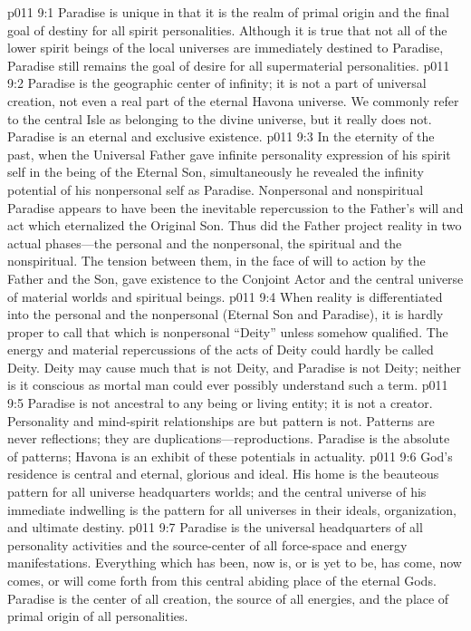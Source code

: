 \vs p011 9:1 Paradise is unique in that it is the realm of primal origin and the final goal of destiny for all spirit personalities. Although it is true that not all of the lower spirit beings of the local universes are immediately destined to Paradise, Paradise still remains the goal of desire for all supermaterial personalities.
\pc \vs p011 9:2 Paradise is the geographic center of infinity; it is not a part of universal creation, not even a real part of the eternal Havona universe. We commonly refer to the central Isle as belonging to the divine universe, but it really does not. Paradise is an eternal and exclusive existence.
\pc \vs p011 9:3 In the eternity of the past, when the Universal Father gave infinite personality expression of his spirit self in the being of the Eternal Son, simultaneously he revealed the infinity potential of his nonpersonal self as Paradise. Nonpersonal and nonspiritual Paradise appears to have been the inevitable repercussion to the Father’s will and act which eternalized the Original Son. Thus did the Father project reality in two actual phases---the personal and the nonpersonal, the spiritual and the nonspiritual. The tension between them, in the face of will to action by the Father and the Son, gave existence to the Conjoint Actor and the central universe of material worlds and spiritual beings.
\vs p011 9:4 When reality is differentiated into the personal and the nonpersonal (Eternal Son and Paradise), it is hardly proper to call that which is nonpersonal “Deity” unless somehow qualified. The energy and material repercussions of the acts of Deity could hardly be called Deity. Deity may cause much that is not Deity, and Paradise is not Deity; neither is it conscious as mortal man could ever possibly understand such a term.
\pc \vs p011 9:5 Paradise is not ancestral to any being or living entity; it is not a creator. Personality and mind\hyp{}spirit relationships are  but pattern is not. Patterns are never reflections; they are duplications---reproductions. Paradise is the absolute of patterns; Havona is an exhibit of these potentials in actuality.
\pc \vs p011 9:6 God’s residence is central and eternal, glorious and ideal. His home is the beauteous pattern for all universe headquarters worlds; and the central universe of his immediate indwelling is the pattern for all universes in their ideals, organization, and ultimate destiny.
\vs p011 9:7 Paradise is the universal headquarters of all personality activities and the source\hyp{}center of all force\hyp{}space and energy manifestations. Everything which has been, now is, or is yet to be, has come, now comes, or will come forth from this central abiding place of the eternal Gods. Paradise is the center of all creation, the source of all energies, and the place of primal origin of all personalities.
